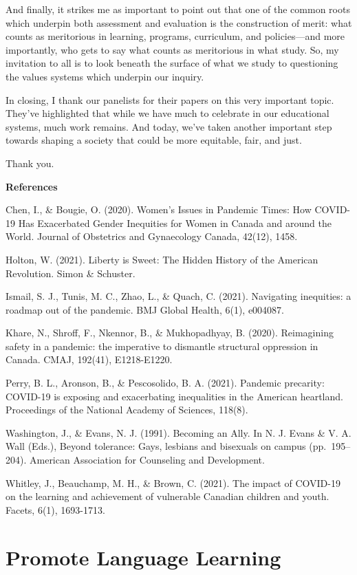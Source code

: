 \documentclass[
]{book}
\begin{document}
And finally, it strikes me as important to point out that one of the common roots which underpin both assessment and evaluation is the construction of merit: what counts as meritorious in learning, programs, curriculum, and policies---and more importantly, who gets to say what counts as meritorious in what study. So, my invitation to all is to look beneath the surface of what we study to questioning the values systems which underpin our inquiry.

In closing, I thank our panelists for their papers on this very important topic. They've highlighted that while we have much to celebrate in our educational systems, much work remains. And today, we've taken another important step towards shaping a society that could be more equitable, fair, and just.

Thank you.

\textbf{References}

Chen, I., \& Bougie, O. (2020). Women's Issues in Pandemic Times: How COVID-19 Has Exacerbated Gender Inequities for Women in Canada and around the World. Journal of Obstetrics and Gynaecology Canada, 42(12), 1458.

Holton, W. (2021). Liberty is Sweet: The Hidden History of the American Revolution. Simon \& Schuster.

Ismail, S. J., Tunis, M. C., Zhao, L., \& Quach, C. (2021). Navigating inequities: a roadmap out of the pandemic. BMJ Global Health, 6(1), e004087.

Khare, N., Shroff, F., Nkennor, B., \& Mukhopadhyay, B. (2020). Reimagining safety in a pandemic: the imperative to dismantle structural oppression in Canada. CMAJ, 192(41), E1218-E1220.

Perry, B. L., Aronson, B., \& Pescosolido, B. A. (2021). Pandemic precarity: COVID-19 is exposing and exacerbating inequalities in the American heartland. Proceedings of the National Academy of Sciences, 118(8).

Washington, J., \& Evans, N. J. (1991). Becoming an Ally. In N. J. Evans \& V. A. Wall (Eds.), Beyond tolerance: Gays, lesbians and bisexuals on campus (pp.~195--204). American Association for Counseling and Development.

Whitley, J., Beauchamp, M. H., \& Brown, C. (2021). The impact of COVID-19 on the learning and achievement of vulnerable Canadian children and youth. Facets, 6(1), 1693-1713.

\newpage

\hypertarget{Theme4}{%
\chapter{Promote Language Learning}\label{Theme4}}
\end{document}
